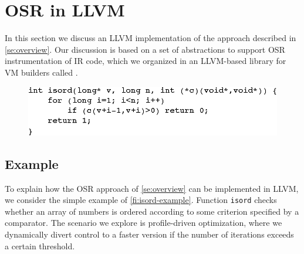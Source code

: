 
\section{OSR in LLVM}
\label{se:osr-llvm}

In this section we discuss an LLVM implementation of the approach described in \mysection\ref{se:overview}. Our discussion is based on a set of abstractions to support OSR instrumentation of IR code, which we organized in an LLVM-based library for VM builders called \osrkit.


\ifdefined\noauthorea
\begin{figure}[t]
\begin{center}
\includegraphics[width=0.9\columnwidth]{figures/isord-example/isord.eps}
\caption{\protect}
\end{center}
\end{figure}
\fi

\subsection{Example}
To explain how the OSR approach of \mysection\ref{se:overview} can be implemented in LLVM, we consider the simple example of \myfigure\ref{fi:isord-example}. Function {\tt isord} checks whether an array of numbers is ordered according to some criterion specified by a comparator. The scenario we explore is profile-driven optimization, where we dynamically divert control to a faster version if the number of iterations exceeds a certain threshold. 

